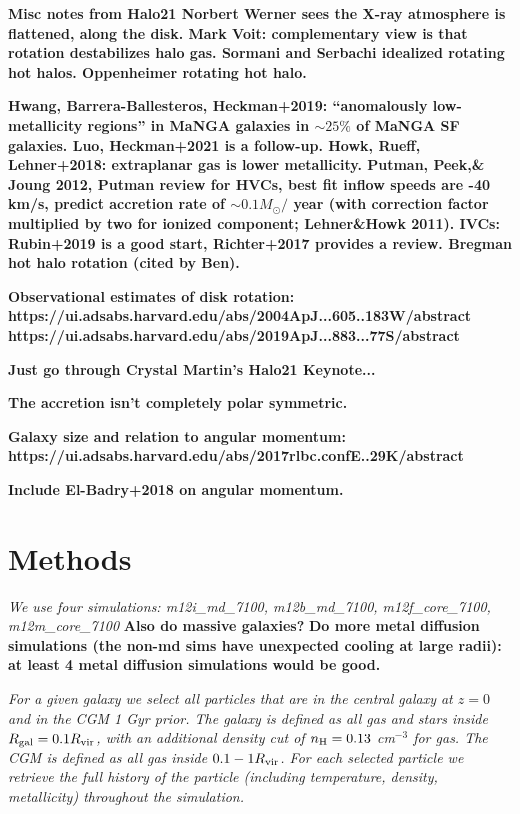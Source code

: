\documentclass[fleqn,usenatbib]{mnras}
\begin{document}
\textbf{
Misc notes from Halo21
Norbert Werner sees the X-ray atmosphere is flattened, along the disk.
Mark Voit: complementary view is that rotation destabilizes halo gas.
Sormani and Serbachi idealized rotating hot halos.
Oppenheimer rotating hot halo.
}

\textbf{
Hwang, Barrera-Ballesteros, Heckman+2019: ``anomalously low-metallicity regions'' in MaNGA galaxies in $\sim 25\%$ of MaNGA SF galaxies. Luo, Heckman+2021 is a follow-up.
Howk, Rueff, Lehner+2018: extraplanar gas is lower metallicity.
Putman, Peek,\& Joung 2012, Putman review for HVCs, best fit inflow speeds are -40 km/s, predict accretion rate of $\sim 0.1 M_\odot/$ year (with correction factor multiplied by two for ionized component; Lehner\&Howk 2011).
IVCs: Rubin+2019 is a good start, Richter+2017 provides a review.
Bregman hot halo rotation (cited by Ben).
}

\textbf{
Observational estimates of disk rotation:
https://ui.adsabs.harvard.edu/abs/2004ApJ...605..183W/abstract
https://ui.adsabs.harvard.edu/abs/2019ApJ...883...77S/abstract
}

\textbf{Just go through Crystal Martin's Halo21 Keynote...}

\textbf{The accretion isn't completely polar symmetric.}

\textbf{Galaxy size and relation to angular momentum:
https://ui.adsabs.harvard.edu/abs/2017rlbc.confE..29K/abstract}

\textbf{
Include El-Badry+2018 on angular momentum.
}

\section{Methods}
\label{s: methods}

\textit{
We use four simulations:
m12i\_md\_7100, m12b\_md\_7100, m12f\_core\_7100, m12m\_core\_7100
}
\textbf{Also do massive galaxies?}
\textbf{Do more metal diffusion simulations (the non-md sims have unexpected cooling at large radii): at least 4 metal diffusion simulations would be good.}

\textit{
For a given galaxy we select all particles that are in the central galaxy at $z=0$ and in the CGM 1 Gyr prior.
The galaxy is defined as all gas and stars inside $R_{\rm gal} = 0.1 R_{\rm vir}$, with an additional density cut of $n_{\rm H} = 0.13$ cm$^{-3}$ for gas.
The CGM is defined as all gas inside $0.1 -1 R_{\rm vir}$.
For each selected particle we retrieve the full history of the particle (including temperature, density, metallicity) throughout the simulation.
}
\end{document}
